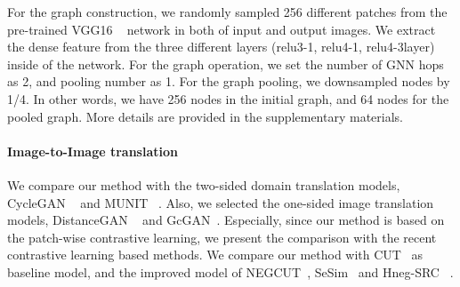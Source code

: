 \documentclass[letterpaper]{article} %
\begin{document}
For the graph construction, we randomly sampled 256 different patches from the pre-trained VGG16 ~\cite{vgg} network in both of input and output images. We extract the dense feature from the three different layers (relu3-1, relu4-1, relu4-3layer) inside of the network. For the graph operation, we set the number of GNN hops as 2, and pooling number as 1. For the graph pooling, we downsampled nodes by 1/4. In other words, we have 256 nodes in the initial graph, and 64 nodes for the pooled graph.
More details are provided in the supplementary materials.












\paragraph{Image-to-Image translation}



We compare our method with the two-sided domain translation models, CycleGAN ~\cite{cyclegan} and MUNIT ~\cite{munit}. Also, we selected the one-sided image translation models, DistanceGAN ~\cite{distancegan} and GcGAN~\cite{gcgan}.
Especially, since our method is based on the patch-wise contrastive learning, we present the comparison with the recent contrastive learning based methods. We compare our method with CUT~\cite{cut} as baseline model, and the improved model of NEGCUT~\cite{negcut}, SeSim~\cite{sesim} and Hneg-SRC ~\cite{HnegSRC}.
\end{document}
